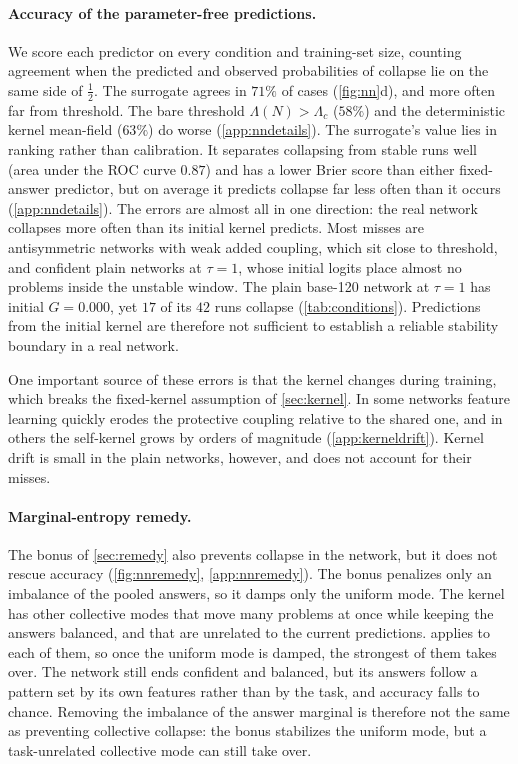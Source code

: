 \paragraph{Accuracy of the parameter-free predictions.}
We score each predictor on every condition and training-set size, counting agreement when the predicted and observed probabilities of collapse lie on the same side of $\tfrac12$.
The surrogate agrees in $71\%$ of cases (\cref{fig:nn}d), and more often far from threshold. The bare threshold $\Lambda(N)>\Lambda_c$ ($58\%$) and the deterministic kernel mean-field ($63\%$) do worse (\cref{app:nndetails}).
The surrogate's value lies in ranking rather than calibration. It separates collapsing from stable runs well (area under the ROC curve $0.87$) and has a lower Brier score than either fixed-answer predictor, but on average it predicts collapse far less often than it occurs (\cref{app:nndetails}).
The errors are almost all in one direction: the real network collapses more often than its initial kernel predicts.
Most misses are antisymmetric networks with weak added coupling, which sit close to threshold, and confident plain networks at $\tau=1$, whose initial logits place almost no problems inside the unstable window. The plain base-120 network at $\tau=1$ has initial $G=0.000$, yet $17$ of its $42$ runs collapse (\cref{tab:conditions}).
Predictions from the initial kernel are therefore not sufficient to establish a reliable stability boundary in a real network.

One important source of these errors is that the kernel changes during training, which breaks the fixed-kernel assumption of \cref{sec:kernel}. In some networks feature learning quickly erodes the protective coupling relative to the shared one, and in others the self-kernel grows by orders of magnitude (\cref{app:kerneldrift}). Kernel drift is small in the plain networks, however, and does not account for their misses.

\paragraph{Marginal-entropy remedy.}
The bonus of \cref{sec:remedy} also prevents collapse in the network, but it does not rescue accuracy (\cref{fig:nnremedy}, \cref{app:nnremedy}).
The bonus penalizes only an imbalance of the pooled answers, so it damps only the uniform mode. The kernel has other collective modes that move many problems at once while keeping the answers balanced, and that are unrelated to the current predictions.  applies to each of them, so once the uniform mode is damped, the strongest of them takes over. The network still ends confident and balanced, but its answers follow a pattern set by its own features rather than by the task, and accuracy falls to chance.
Removing the imbalance of the answer marginal is therefore not the same as preventing collective collapse: the bonus stabilizes the uniform mode, but a task-unrelated collective mode can still take over.
